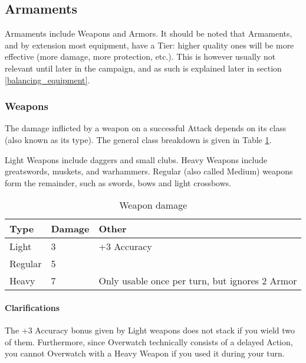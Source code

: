 \subsection{Armaments}

Armaments include Weapons and Armors. It should be noted that Armaments, and by extension most equipment, have a Tier: higher quality ones will be more effective (more damage, more protection, etc.). This is however usually not relevant until later in the campaign, and as such is explained later in section \ref{balancing_equipment}.

\subsubsection{Weapons}

The damage inflicted by a weapon on a successful Attack depends on its class (also known as its type). The general class breakdown is given in Table \ref{weapon_damage}. 

Light Weapons include daggers and small clubs. Heavy Weapons include greatswords, muskets, and warhammers. Regular (also called Medium) weapons form the remainder, such as swords, bows and light crossbows.

\begin{table}[h!tbp]
	\begin{center}
		\begin{tabular}{p{1.25cm}p{1.5cm}p{4cm}} \toprule
			
			\textbf{Type} & \textbf{Damage} & \textbf{Other} \\ \midrule
			
			Light & 3 & +3 Accuracy \\
			Regular & 5 & \\
			Heavy & 7 & Only usable once per turn, but ignores 2 Armor\\

			\bottomrule
		\end{tabular}
	\end{center}
	\caption{Weapon damage}
	\label{weapon_damage}
\end{table}

\paragraph{Clarifications}

The +3 Accuracy bonus given by Light weapons does not stack if you wield two of them. Furthermore, since Overwatch technically consists of a delayed Action, you cannot Overwatch with a Heavy Weapon if you used it during your turn.

